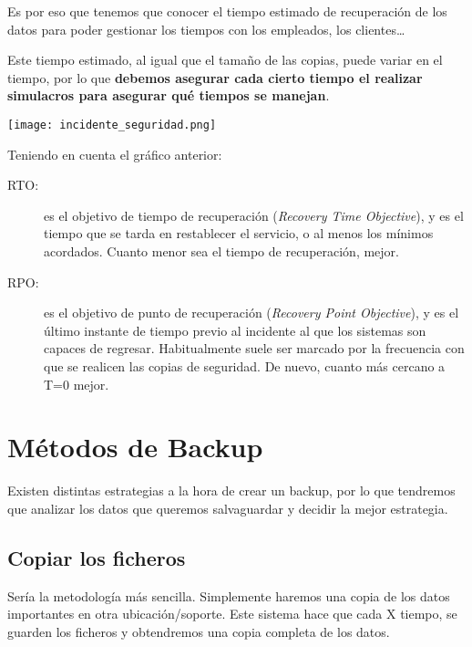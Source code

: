 
Es por eso que tenemos que conocer el tiempo estimado de recuperación de los datos para poder gestionar los tiempos con los empleados, los clientes…

Este tiempo estimado, al igual que el tamaño de las copias, puede variar en el tiempo, por lo que \textbf{debemos asegurar cada cierto tiempo el realizar simulacros para asegurar qué tiempos se manejan}.

\begin{center}
    \vspace{-15pt}
    \texttt{[image: incidente\_seguridad.png]}
    \vspace{-20pt}
\end{center}

Teniendo en cuenta el gráfico anterior:
\begin{description}
    \item[RTO:] es el objetivo de tiempo de recuperación (\textit{Recovery Time Objective}), y es el tiempo que se tarda en restablecer el servicio, o al menos los mínimos acordados. Cuanto menor sea el tiempo de recuperación, mejor.
    \item[RPO:] es el objetivo de punto de recuperación (\textit{Recovery Point Objective}), y es el último instante de tiempo previo al incidente al que los sistemas son capaces de regresar. Habitualmente suele ser marcado por la frecuencia con que se realicen las copias de seguridad. De nuevo, cuanto más cercano a T=0 mejor.
\end{description}

\section{Métodos de Backup}
Existen distintas estrategias a la hora de crear un backup, por lo que tendremos que analizar los datos que queremos salvaguardar y decidir la mejor estrategia.

\subsection{Copiar los ficheros}
Sería la metodología más sencilla. Simplemente haremos una copia de los datos importantes en otra ubicación/soporte. Este sistema hace que cada X tiempo, se guarden los ficheros y obtendremos una copia completa de los datos.


